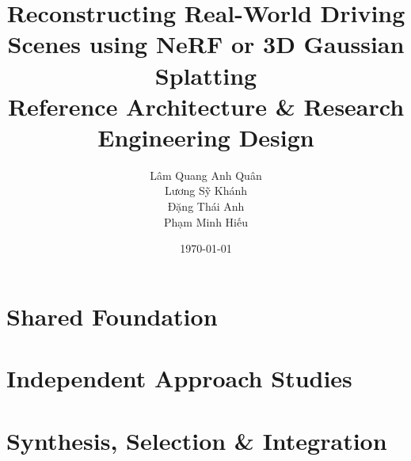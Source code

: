 \documentclass[11pt,a4paper]{report}
\title{\sffamily\bfseries Reconstructing Real-World Driving Scenes using NeRF or 3D Gaussian Splatting\\[0.5em]
  \large\mdseries Reference Architecture \& Research Engineering Design}
\author{Lâm Quang Anh Quân \\ Lương Sỹ Khánh \\ Đặng Thái Anh \\ Phạm Minh Hiếu}
\date{\today}
\begin{document}
\maketitle
\tableofcontents

\part{Shared Foundation}







\part{Independent Approach Studies}






\part{Synthesis, Selection \& Integration}










\end{document}
